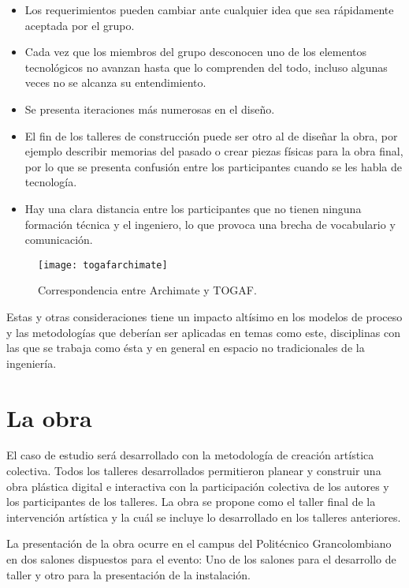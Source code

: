 \begin{itemize}
    \item Los requerimientos pueden cambiar ante cualquier idea que sea rápidamente aceptada por el grupo.
    \item Cada vez que los miembros del grupo desconocen uno de los elementos tecnológicos no avanzan hasta que lo comprenden del todo, incluso algunas veces no se alcanza su entendimiento.
    \item Se presenta iteraciones más numerosas en el diseño.
    \item El fin de los talleres de construcción puede ser otro al de diseñar la obra, por ejemplo describir memorias del pasado o crear piezas físicas para la obra final, por lo que se presenta confusión entre los participantes cuando se les habla de tecnología.
    \item Hay una clara distancia entre los participantes que no tienen ninguna formación técnica y el ingeniero, lo que provoca una brecha de vocabulario y comunicación.
\end{itemize}

\begin{figure}[h]\label{togafarchimate}
\centering
\texttt{[image: togafarchimate]}
\caption{Correspondencia entre Archimate y TOGAF.}
\end{figure}

Estas y otras consideraciones tiene un impacto altísimo en los modelos de proceso y las metodologías que deberían ser aplicadas en temas como este, disciplinas con las que se trabaja como ésta y en general en espacio no tradicionales de la ingeniería.  

\section{La obra}

El caso de estudio será desarrollado con la metodología de creación artística colectiva\cite{casacuberta2003creacion}. Todos los talleres desarrollados permitieron planear y construir una obra plástica digital e interactiva con la participación colectiva de los autores y los participantes de los talleres. La obra se propone como el taller final de la intervención artística y la cuál se incluye lo desarrollado en los talleres anteriores.

La presentación de la obra ocurre en el campus del Politécnico Grancolombiano en dos salones dispuestos para el evento: Uno de los salones para el desarrollo de taller y otro para la presentación de la instalación.

